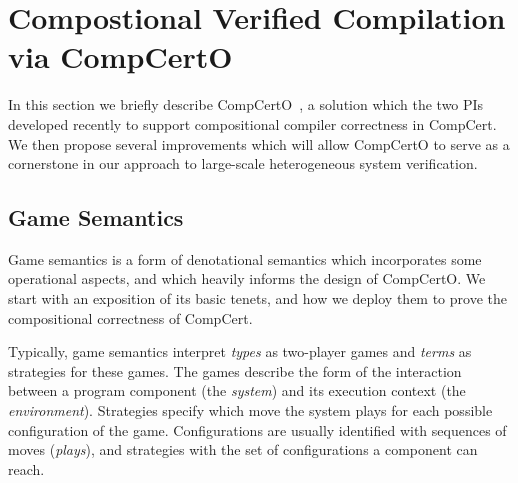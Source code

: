 \section{Compostional Verified Compilation via CompCertO}
\label{sec:compcerto}

In this section we briefly describe CompCertO~\cite{compcerto},
a solution which the two PIs developed recently 
to support compositional compiler correctness in CompCert.
We then propose several improvements which will
allow CompCertO to serve as a cornerstone
in our approach to large-scale heterogeneous system verification.

\subsection{Game Semantics} \label{sec:gamesem} %


Game semantics is a form of denotational semantics which
incorporates some operational aspects,
and which heavily informs the design of CompCertO.
We start with an exposition of its basic tenets,
and how we deploy them to prove the compositional correctness of CompCert.

Typically,
game semantics interpret
\emph{types} as two-player games
and \emph{terms} as strategies for these games.
The games describe the form of the interaction
between a program component %
(the \emph{system})
and its execution context
(the \emph{environment}).
Strategies
specify which move the system plays
for each possible configuration of the game.
Configurations are usually identified with sequences of moves
(\emph{plays}),
and strategies with the set of configurations
a component can reach.



\vspace*{-2ex}
